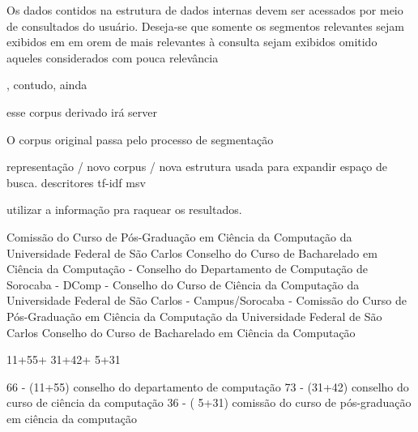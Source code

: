 Os dados contidos na estrutura de dados internas devem ser acessados por meio de consultados do usuário. Deseja-se que somente os segmentos relevantes sejam exibidos em em orem de 
mais relevantes à consulta sejam exibidos 
omitido aqueles considerados com pouca relevância



, contudo, ainda 

esse corpus derivado irá server 



O corpus original passa pelo processo de segmentação 


representação / novo corpus / nova estrutura usada para expandir espaço de busca.
descritores
tf-idf
msv





utilizar a informação pra raquear os resultados.



















































Comissão do Curso de Pós-Graduação em Ciência da Computação da Universidade Federal de São Carlos 
Conselho do Curso de Bacharelado em Ciência da Computação
- Conselho do Departamento de Computação de Sorocaba - DComp
- Conselho do Curso de Ciência da Computação da Universidade Federal de São Carlos - Campus/Sorocaba
- Comissão do Curso de Pós-Graduação em Ciência da Computação da Universidade Federal de São Carlos 
Conselho do Curso de Bacharelado em Ciência da Computação

11+55+
31+42+
5+31


66 - (11+55) conselho do departamento de computação 
73 - (31+42) conselho do curso de ciência da computação 
36 - ( 5+31) comissão do curso de pós-graduação em ciência da computação 






